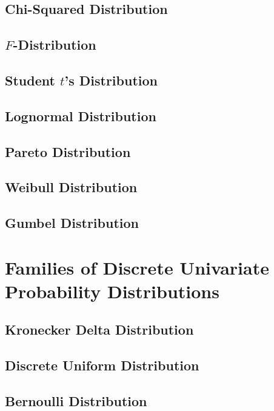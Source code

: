 \documentclass[11pt]{report} %
\begin{document}
\subsection{Chi-Squared Distribution}

\subsection{$F$-Distribution}

\subsection{Student $t$'s Distribution}

\subsection{Lognormal Distribution}

\subsection{Pareto Distribution}

\subsection{Weibull Distribution}

\subsection{Gumbel Distribution}

\section{Families of Discrete Univariate Probability Distributions}

\subsection{Kronecker Delta Distribution}

\subsection{Discrete Uniform Distribution}

\subsection{Bernoulli Distribution}
\end{document}
